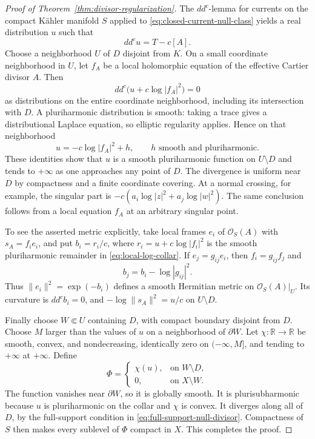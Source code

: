 \documentclass[11pt]{amsart}
\theoremstyle{definition}
\theoremstyle{remark}
\numberwithin{equation}{section}
\newcommand{\ddc}{dd^c}
\begin{document}
\begin{proof}[Proof of Theorem~\ref{thm:divisor-regularization}]
The $dd^c$-lemma for currents on the compact K\"ahler manifold $S$
applied to \eqref{eq:closed-current-null-class} yields a real
distribution $u$ such that
\begin{equation}
\label{eq:global-log-potential}
 \ddc u=T-c[A].
\end{equation}
Choose a neighborhood $U$ of $D$ disjoint from $K$.  On a small
coordinate neighborhood in $U$, let $f_A$ be a local holomorphic
equation of the effective Cartier divisor $A$.  Then
\[
 \ddc\bigl(u+c\log|f_A|^2\bigr)=0
\]
as distributions on the entire coordinate neighborhood, including
its intersection with $D$.  A pluriharmonic distribution is smooth:
taking a trace gives a distributional Laplace equation, so elliptic
regularity applies.  Hence on that neighborhood
\begin{equation}
\label{eq:local-log-collar}
 u=-c\log|f_A|^2+h,
 \qquad h\text{ smooth and pluriharmonic}.
\end{equation}
These identities show that $u$ is a smooth pluriharmonic function
on $U\setminus D$ and tends to $+\infty$ as one approaches any
point of $D$.  The divergence is uniform near $D$ by compactness
and a finite coordinate covering.  At a normal crossing, for
example, the singular part is
$-c(a_i\log|z|^2+a_j\log|w|^2)$.  The same conclusion follows
from a local equation $f_A$ at an arbitrary singular point.

To see the asserted metric explicitly, take local frames $e_i$ of
$\mathcal O_S(A)$ with $s_A=f_i e_i$, and put
$b_i=r_i/c$, where $r_i=u+c\log|f_i|^2$ is the smooth
pluriharmonic remainder in \eqref{eq:local-log-collar}.  If
$e_j=g_{ij}e_i$, then $f_i=g_{ij}f_j$ and
\[
 b_j=b_i-\log|g_{ij}|^2.
\]
Thus $\|e_i\|^2=\exp(-b_i)$ defines a smooth Hermitian metric
on $\mathcal O_S(A)|_U$.  Its curvature is $\ddc b_i=0$, and
$-\log\|s_A\|^2=u/c$ on $U\setminus D$.

Finally choose $W\Subset U$ containing $D$, with compact boundary
disjoint from $D$.  Choose $M$ larger than the values of $u$ on a
neighborhood of $\partial W$.  Let $\chi:\mathbb R\to\mathbb R$
be smooth, convex, and nondecreasing, identically zero on
$(-\infty,M]$, and tending to $+\infty$ at $+\infty$.  Define
\[
 \Phi=
 \begin{cases}
   \chi(u),&\text{on }W\setminus D,\\
   0,&\text{on }X\setminus W.
 \end{cases}
\]
The function vanishes near $\partial W$, so it is globally smooth.
It is plurisubharmonic because $u$ is pluriharmonic on the collar
and $\chi$ is convex.  It diverges along all of $D$, by the
full-support condition in \eqref{eq:full-support-null-divisor}.
Compactness of $S$ then makes every sublevel of $\Phi$ compact
in $X$.  This completes the proof.
\end{proof}
\end{document}
